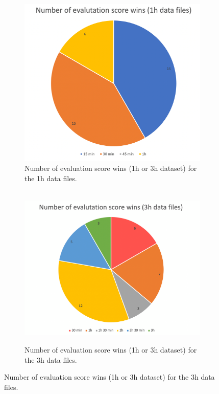 \begin{figure}
  \centering
  \begin{subfigure}{.475\textwidth}
    \centering
    \includegraphics[width=1\textwidth]{./images/clusteringResults/clusteringResultsGraph1h.png}
    \caption{Number of evaluation score wins (1h or 3h dataset) for the 1h data files.}
    \label{figure:clusteringResultsGraph1h}
  \end{subfigure}
  \hfill
  \begin{subfigure}{.475\textwidth}
    \centering
    \  \includegraphics[width=1.2\textwidth]{./images/clusteringResults/clusteringResultsGraph3h.png}
    \caption{Number of evaluation score wins (1h or 3h dataset) for the 3h data files.}
    \label{figure:clusteringResultsGraph3h}
  \end{subfigure}
\end{figure}

